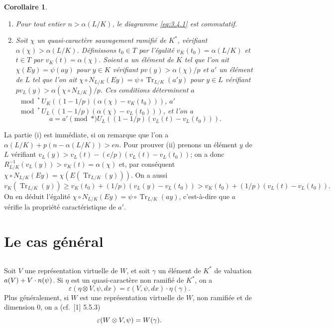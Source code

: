 \documentclass[12pt,a4paper]{article}
\theoremstyle{plain}
\newtheorem{corollary}[theorem]{Corollaire}
\theoremstyle{definition}
\theoremstyle{remark}
\DeclareMathOperator{\Tr}{Tr}
\let\dim\relax\let\det\relax
\providecommand{\Tr}{\operatorname{Tr}}
\begin{document}
\begin{corollary}\label{cor:3.12}
\begin{enumerate}[label=(\roman*)]
\item Pour tout entier $n > \alpha(L/K)$, le diagramme \eqref{eq:3.4.1} est commutatif.
\item Soit $\chi$ un quasi-caract\`ere sauvagement ramifi\'e de $K^*$, v\'erifiant $\alpha(\chi) > \alpha(L/K)$. D\'efinissons $t_0 \in T$ par l'\'egalit\'e $v_K(t_0) = \alpha(L/K)$ et $t \in T$ par $v_K(t) = \alpha(\chi)$. Soient $a$ un \'el\'ement de $K$ tel que l'on ait $\chi(Ey) = \psi(ay)$ pour $y \in K$ v\'erifiant $pv(y) > \alpha(\chi)/p$ et $a'$ un \'el\'ement de $L$ tel que l'on ait $\chi \circ N_{L/K}(Ey) = \psi \circ \Tr_{L/K}(a'y)$ pour $y \in L$ v\'erifiant $pv_L(y) > \alpha(\chi \circ N_{L/K})/p$. Ces conditions d\'eterminent $a$ $\mod^*\, U_K((1-1/p)(\alpha(\chi) - v_K(t_0)))$, $a'$ $\mod^*\, U_L((1-1/p)(\alpha(\chi) - v_L(t_0)))$, et l'on a
\[
a = a' \pmod{*} U_L((1-1/p)(v_L(t) - v_L(t_0))).
\]
\end{enumerate}
\end{corollary}

La partie (i) est imm\'ediate, si on remarque que l'on a $\alpha(L/K) + p(n - \alpha(L/K)) > en$. Pour prouver (ii) prenons un \'el\'ement $y$ de $L$ v\'erifiant $v_L(y) > v_L(t) - (e/p)(v_L(t) - v_L(t_0))$; on a donc $R_{L/K}^{-1}(v_L(y)) > v_K(t) = \alpha(\chi)$ et, par cons\'equent $\chi \circ N_{L/K}(Ey) = \chi(E(\Tr_{L/K}(y)))$. On a aussi
\[
v_K(\Tr_{L/K}(y)) \geq v_K(t_0) + (1/p)(v_L(y) - v_L(t_0)) > v_K(t_0) + (1/p)(v_L(t) - v_L(t_0)).
\]
On en d\'eduit l'\'egalit\'e $\chi \circ N_{L/K}(Ey) = \psi \circ \Tr_{L/K}(ay)$, c'est-\`a-dire que $a$ v\'erifie la propri\'et\'e caract\'eristique de $a'$.


\section{Le cas g\'en\'eral}
\label{sec:4}

\subsection{}
\label{sec:4.1}

Soit $V$ une repr\'esentation virtuelle de $W$, et soit $\gamma$ un \'el\'ement de $K^*$ de valuation $a(V) + \dim V \cdot n(\psi)$.
Si $\eta$ est un quasi-caract\`ere non ramifi\'e de $K^*$, on a
\begin{equation}\label{eq:4.1.1}
\varepsilon(\eta \otimes V, \psi, dx) = \varepsilon(V, \psi, dx) \cdot \eta(\gamma).
\end{equation}
Plus g\'en\'eralement, si $W$ est une repr\'esentation virtuelle de $W$, non ramifi\'ee et de dimension 0, on a (cf.~[1] 5.5.3)
\begin{equation}\label{eq:4.1.2}
\varepsilon(W \otimes V, \psi) = \det W(\gamma).
\end{equation}
\end{document}
